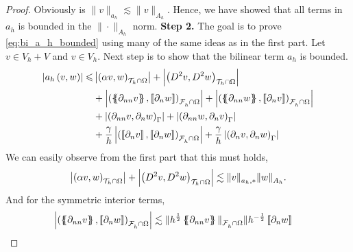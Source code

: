 \begin{proof}
             Obviously is $\| v \|_{a_{h}  }^{  } \lesssim \| v \|_{A_{h}  }^{  }$. Hence, we have showed that all terms in $a_{h}$ is bounded in the $\|\cdot   \|_{A_{h}  }^{  } $ norm.
             \newpara
         \textbf{Step 2.} The goal is to prove \eqref{eq:bi_a_h_bounded} using many of the same ideas as in the first part. Let $v \in V_{h} +V $ and $v \in V_{h}$. Next step is to show that the bilinear term $ a_{h}$ is bounded.
                \begin{equation}
                    \begin{split}
                        \abs{ a_{h} \left( v, w \right) }   \le  &   \abs{\left( \alpha  v, w \right) _{\mathcal{T} _{h} \cap \Omega }  }    +  \abs{\left( D^2 v, D^2w \right) _{\mathcal{T} _{h} \cap \Omega}  }  \\
                                                     & + \abs{\left( \mean{  \partial _{n n} v }, \jump{ \partial _{n }w} \right)_{\mathcal{F}_{h}^{} \cap \Omega}  }   + \abs{\left( \mean{ \partial _{nn } w }, \jump{ \partial _{n}v }
                                                     \right)_{\mathcal{F}_{h}^{} \cap \Omega}  } \\
                                                     & + \abs{\left(  \partial _{n n} v ,  \partial _{n }w \right)_{\Gamma }}     +
                                                     \abs{\left(  \partial _{n n} w ,  \partial _{n}v       \right)_{\Gamma }  }
                                                     \\
                                                     & + \frac{\gamma }{h} \abs{ \left( \jump{ \partial _{n} v}, \jump{ \partial _{n} w   }   \right)_{\mathcal{F}_{h}^{} \cap \Omega}  } + \frac{\gamma }{h} \abs{ \left(  \partial _{n} v,  \partial _{n} w
                                                     \right)_{\Gamma }  }
                    \end{split}
                \end{equation}
                     We can easily observe from the first part that this must holds, \[
    \left\lvert \left( \alpha  v, w \right) _{\mathcal{T} _{h} \cap \Omega }   \right\rvert    +  \left\lvert \left( D^2 v, D^2w \right) _{\mathcal{T} _{h} \cap \Omega}   \right\rvert \lesssim \| v \|_{ a_{h},* }^{  } \| w \|_{A_{h}  }^{  }.
    \]
    And for the symmetric interior terms,
    \[
        \begin{split}
            \abs{\left( \mean{  \partial _{n n} v }, \jump{ \partial _{n }w} \right)_{\mathcal{F}_{h}^{} \cap \Omega}  } &\lesssim \| h^{\frac{1}{2}}\mean{ \partial _{nn}v }   \|_{ \mathcal{F}_{h}^{} \cap \Omega  }^{  } \| h^{-\frac{1}{2}}\jump{ \partial _{n }w}

\end{split}\]
\end{proof}
